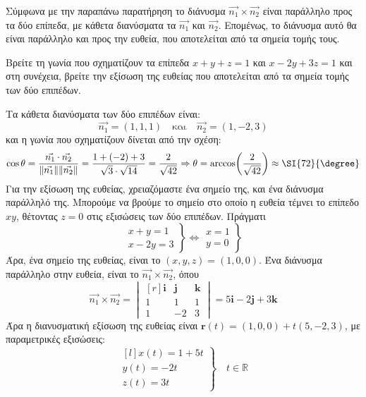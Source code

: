 \begin{rem}
  Σύμφωνα με την παραπάνω παρατήρηση το διάνυσμα 
  $ \vec{n_{1}} \times \vec{n_{2}} $ είναι παράλληλο προς τα δύο επίπεδα, με κάθετα 
  διανύσματα τα $ \vec{n_{1}} $ και $ \vec{n_{2}} $. Επομένως, το διάνυσμα αυτό 
  θα είναι παράλληλο και προς την ευθεία, που αποτελείται από τα σημεία τομής τους.
\end{rem}

\begin{example}
  Βρείτε τη γωνία που σχηματίζουν τα επίπεδα $ x+y+z=1 $ και $ x-2y+3z=1 $ και 
  στη συνέχεια, βρείτε την εξίσωση της ευθείας που αποτελείται από τα σημεία τομής 
  των δύο επιπέδων.
\end{example}
\begin{solution}
  Τα κάθετα διανύσματα των δύο επιπέδων είναι:
  \[
    \vec{n_{1}} = (1,1,1) \quad \text{και} \quad \vec{n_{2}} = (1,-2,3) 
  \]
  και η γωνία που σχηματίζουν δίνεται από την σχέση:
  \[
    \cos{\theta} = \frac{\vec{n_{1}} \cdot \vec{n_{2}}}{\norm{\vec{n_{1}}}
    \norm{\vec{n_{2}}}} = \frac{1+(-2)+3}{\sqrt{3}\cdot \sqrt{14}} =
    \frac{2}{\sqrt{42}} \Rightarrow \theta = \arccos(\frac{2}{\sqrt{42}}) \approx 
    \SI{72}{\degree} 
  \] 
  Για την εξίσωση της ευθείας, χρειαζόμαστε ένα σημείο της, και ένα διάνυσμα 
  παράλληλό της. Μπορούμε να βρούμε το σημείο στο οποίο η ευθεία τέμνει το επίπεδο 
  $ xy $, θέτοντας $ z=0 $ στις εξισώσεις των δύο επιπέδων. Πράγματι 
  \[
    \left.
      \begin{matrix}
        x+y=1 \\
        x-2y=3
      \end{matrix} 
    \right\} \Leftrightarrow 
    \left.
      \begin{matrix}
        x=1 \\
        y=0
      \end{matrix} 
    \right\} 
  \] 
  Άρα, ένα σημείο της ευθείας, είναι το $ (x,y,z) = (1,0,0) $.
  Ένα διάνυσμα παράλληλο στην ευθεία, είναι το $ \vec{n_{1}} \times \vec{n_{2}} $, 
  όπου
  \[
    \vec{n_{1}} \times \vec{n_{2}} = 
    \begin{vmatrix*}[r]
      \mathbf{i} & \mathbf{j} & \mathbf{k} \\
      1 & 1 & 1 \\
      1 & -2 & 3
    \end{vmatrix*} = 5 \mathbf{i}- 2 \mathbf{j}+ 3 \mathbf{k} 
  \] 
  Άρα η διανυσματική εξίσωση της ευθείας είναι 
  $ \mathbf{r}(t) = (1,0,0) + t(5,-2,3) $, με παραμετρικές εξισώσεις:
  \[
    \left.
      \begin{matrix*}[l]
        x(t) = 1+5t \\
        y(t) = -2t \\
        z(t) = 3t
      \end{matrix*} 
    \right\} \quad t \in \mathbb{R}
  \]
\end{solution}



